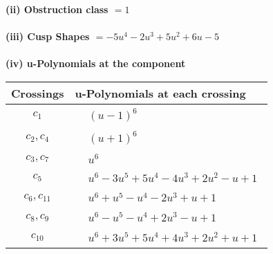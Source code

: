 \documentclass[1p]{elsarticle_modified}
\theoremstyle{definition}
\begin{document}
\flushleft \textbf{(ii) Obstruction class $= 1$}\\~\\
\flushleft \textbf{(iii) Cusp Shapes $= -5 u^4-2 u^3+5 u^2+6 u-5$}\\~\\
\newpage\renewcommand{\arraystretch}{1}
\flushleft \textbf{(iv) u-Polynomials at the component}\newline \\
\begin{tabular}{m{50pt}|m{274pt}}
Crossings & \hspace{64pt}u-Polynomials at each crossing \\
\hline $$\begin{aligned}c_{1}\end{aligned}$$&$\begin{aligned}
&(u-1)^6
\end{aligned}$\\
\hline $$\begin{aligned}c_{2},c_{4}\end{aligned}$$&$\begin{aligned}
&(u+1)^6
\end{aligned}$\\
\hline $$\begin{aligned}c_{3},c_{7}\end{aligned}$$&$\begin{aligned}
&u^6
\end{aligned}$\\
\hline $$\begin{aligned}c_{5}\end{aligned}$$&$\begin{aligned}
&u^6-3 u^5+5 u^4-4 u^3+2 u^2- u+1
\end{aligned}$\\
\hline $$\begin{aligned}c_{6},c_{11}\end{aligned}$$&$\begin{aligned}
&u^6+u^5- u^4-2 u^3+u+1
\end{aligned}$\\
\hline $$\begin{aligned}c_{8},c_{9}\end{aligned}$$&$\begin{aligned}
&u^6- u^5- u^4+2 u^3- u+1
\end{aligned}$\\
\hline $$\begin{aligned}c_{10}\end{aligned}$$&$\begin{aligned}
&u^6+3 u^5+5 u^4+4 u^3+2 u^2+u+1
\end{aligned}$\\
\hline
\end{tabular}\\~\\
\end{document}

